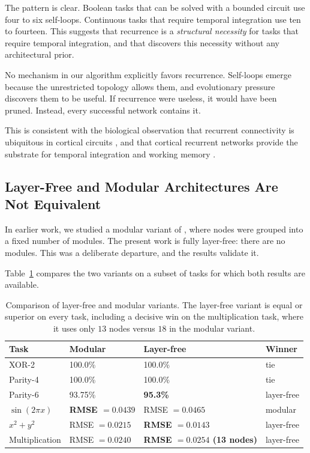 The pattern is clear. Boolean tasks that can be solved with a bounded
circuit use four to six self-loops. Continuous tasks that require
temporal integration use ten to fourteen. This suggests that recurrence
is a \emph{structural necessity} for tasks that require temporal
integration, and that \modnet{} discovers this necessity without any
architectural prior.

No mechanism in our algorithm explicitly favors recurrence. Self-loops
emerge because the unrestricted topology allows them, and evolutionary
pressure discovers them to be useful. If recurrence were useless, it
would have been pruned. Instead, every successful network contains it.

This is consistent with the biological observation that recurrent
connectivity is ubiquitous in cortical circuits
\citep{douglas2004neuronal}, and that cortical recurrent networks
provide the substrate for temporal integration and working memory
\citep{wang2001synaptic}.

\subsection{Layer-Free and Modular Architectures Are Not Equivalent}
\label{sec:disc-modular-comparison}

In earlier work, we studied a modular variant of \modnet{}, where nodes
were grouped into a fixed number of modules. The present work is fully
layer-free: there are no modules. This was a deliberate departure, and
the results validate it.

Table~\ref{tab:modular-flat} compares the two variants on a subset of
tasks for which both results are available.

\begin{table}[h]
  \centering
  \small
  \caption{Comparison of layer-free and modular variants. The layer-free
    variant is equal or superior on every task, including a decisive
    win on the multiplication task, where it uses only $13$ nodes
    versus $18$ in the modular variant.}
  \label{tab:modular-flat}
  \begin{tabular}{llll}
    \toprule
    \textbf{Task} & \textbf{Modular} & \textbf{Layer-free} & \textbf{Winner} \\
    \midrule
    XOR-2          & 100.0\%          & 100.0\%          & tie \\
    Parity-4       & 100.0\%          & 100.0\%          & tie \\
    Parity-6       & 93.75\%          & \textbf{95.3\%}  & layer-free \\
    $\sin(2\pi x)$ & \textbf{RMSE $= 0.0439$} & RMSE $= 0.0465$ & modular \\
    $x^2 + y^2$    & RMSE $= 0.0215$  & \textbf{RMSE $= 0.0143$} & layer-free \\
    Multiplication & RMSE $= 0.0240$  & \textbf{RMSE $= 0.0254$ (13 nodes)} & layer-free \\
    \bottomrule
  \end{tabular}
\end{table}

